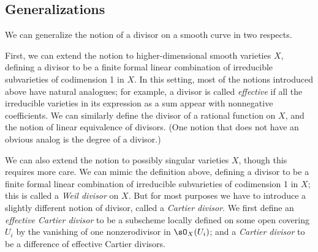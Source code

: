\subsection*{Generalizations}

We can generalize the notion of a divisor on a smooth curve in two respects.

First, we can extend the notion to higher-dimensional smooth varieties
$X$, defining a divisor to be a finite formal linear combination of
irreducible subvarieties of codimension 1 in $X$. In this setting,
most of the notions introduced above have natural analogues; for
%
example, a divisor is called \emph{effective} if all the irreducible
varieties in its expression as a sum appear with nonnegative
coefficients. We can similarly define the divisor of a rational
function on $X$, and the notion of linear equivalence of divisors.
(One notion that does not have an obvious analog is the degree of a divisor.)

We can also extend the notion to possibly singular varieties $X$,
though this requires more care. We can mimic the definition above,
defining a divisor to be a finite formal linear combination of
irreducible subvarieties of codimension 1 in $X$; this is called a
%
\emph{Weil divisor} on $X$. But for most purposes we have to introduce
a slightly different notion of divisor, called a \emph{Cartier
  divisor}. We first define an \emph{effective Cartier divisor} to be
%
a subscheme locally defined on some open covering $U_{i}$ by the
vanishing of one nonzerodivisor in $\sO_{X}(U_{i})$; and a
\emph{Cartier divisor} to be a difference of effective Cartier divisors.

